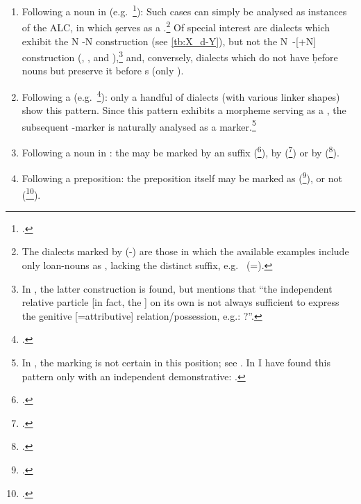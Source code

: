 \begin{enumerate}
\item  Following a noun in \free* (e.g.\ \Amd {}\footcite[72]{GreenblattAmidya}): Such cases can simply be analysed as instances of the ALC, in which \d serves as a \lnk*.\footnote{The dialects marked by (-) are those in which the available examples include only loan-nouns as \prims,  lacking the distinct  \free* suffix, e.g.\ \JZax {} (=).} Of special interest are dialects which exhibit the N \D-N construction (see \vref{tb:X_d-Y}), but not the \mbox{N \D-[\dem+N]} construction (\Cal, \Jil, \Alq and \Qar),\footnote{In \Diy, the latter construction is found, but \citet[95]{NapiorkowskaDiyana} mentions that  \enquote{the independent relative particle [in fact, the ] on its own is not always sufficient to express the genitive [=attributive] relation/possession, e.g.: ?}. } and, conversely, dialects which do not have \d before nouns but preserve it before \dem*s (only \JSan).

\item  Following a \lnk* (e.g.\ \JZax {}\footnote{.}): only a handful of dialects (with various linker shapes) show this pattern. Since this pattern exhibits a morpheme serving as a \lnk*, the subsequent \D-marker is naturally analysed as a \gen* marker.\footnote{In \Gaz, the \gen* marking is not certain in this position; see \citet[316 (22)]{GutmanGaznax}. In \Diy I have found this pattern only with an independent demonstrative:  \citep[95]{NapiorkowskaDiyana}.}

\item Following a noun in \cst*: the \cst* may be marked by an \ed  suffix (\Jil {}\footnote{.}), by \ez* (\JSan {}\footnote{.}) or by  (\JZax {}\footnote{.}).

\item Following a preposition: the preposition itself may be marked as \cst* (\Betn {}\footcite[121 {[500]}]{MutzafiBetanure}), or not (\Betn {}\footcite[120 {[354]}]{MutzafiBetanure}). 

\end{enumerate}

